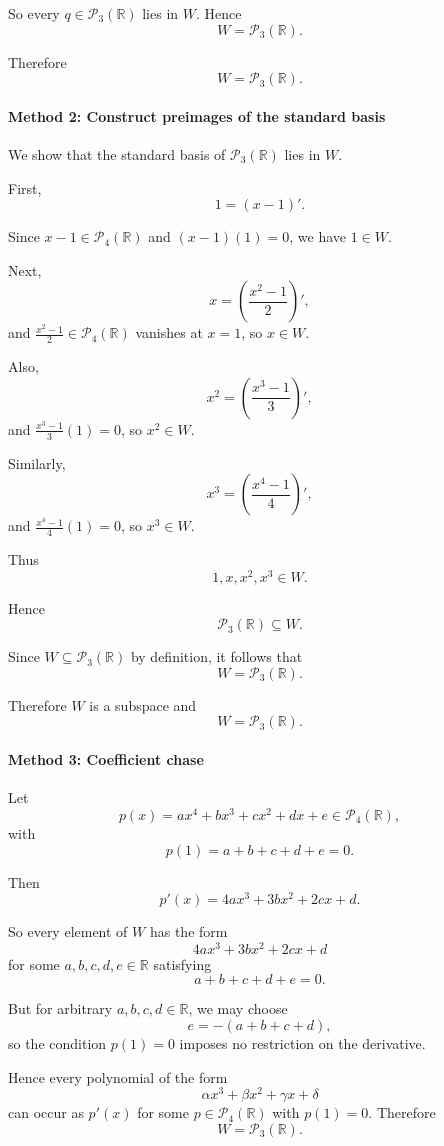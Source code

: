 \documentclass[12pt]{article}
\begin{document}
So every \(q\in\mathcal P_3(\mathbb R)\) lies in \(W\). Hence
\[
W=\mathcal P_3(\mathbb R).
\]

Therefore
\[
\boxed{W=\mathcal P_3(\mathbb R)}.
\]

\newpage
\paragraph{Method 2: Construct preimages of the standard basis}

We show that the standard basis of \(\mathcal P_3(\mathbb R)\) lies in \(W\).

First,
\[
1=(x-1)'.
\]

Since \(x-1\in\mathcal P_4(\mathbb R)\) and \((x-1)(1)=0\), we have \(1\in W\).

Next,
\[
x=\left(\frac{x^2-1}{2}\right)',
\]
and \(\frac{x^2-1}{2}\in\mathcal P_4(\mathbb R)\) vanishes at \(x=1\), so \(x\in W\).

Also,
\[
x^2=\left(\frac{x^3-1}{3}\right)',
\]
and \(\frac{x^3-1}{3}(1)=0\), so \(x^2\in W\).

Similarly,
\[
x^3=\left(\frac{x^4-1}{4}\right)',
\]
and \(\frac{x^4-1}{4}(1)=0\), so \(x^3\in W\).

Thus
\[
1,x,x^2,x^3\in W.
\]

Hence
\[
\mathcal P_3(\mathbb R)\subseteq W.
\]

Since \(W\subseteq \mathcal P_3(\mathbb R)\) by definition, it follows that
\[
W=\mathcal P_3(\mathbb R).
\]

Therefore \(W\) is a subspace and
\[
\boxed{W=\mathcal P_3(\mathbb R)}.
\]

\paragraph{Method 3: Coefficient chase}

Let
\[
p(x)=ax^4+bx^3+cx^2+dx+e\in\mathcal P_4(\mathbb R),
\]
with
\[
p(1)=a+b+c+d+e=0.
\]

Then
\[
p'(x)=4ax^3+3bx^2+2cx+d.
\]

So every element of \(W\) has the form
\[
4ax^3+3bx^2+2cx+d
\]
for some \(a,b,c,d,e\in\mathbb R\) satisfying
\[
a+b+c+d+e=0.
\]

But for arbitrary \(a,b,c,d\in\mathbb R\), we may choose
\[
e=-(a+b+c+d),
\]
so the condition \(p(1)=0\) imposes no restriction on the derivative.

Hence every polynomial of the form
\[
\alpha x^3+\beta x^2+\gamma x+\delta
\]
can occur as \(p'(x)\) for some \(p\in\mathcal P_4(\mathbb R)\) with \(p(1)=0\). Therefore
\[
W=\mathcal P_3(\mathbb R).
\]
\end{document}
